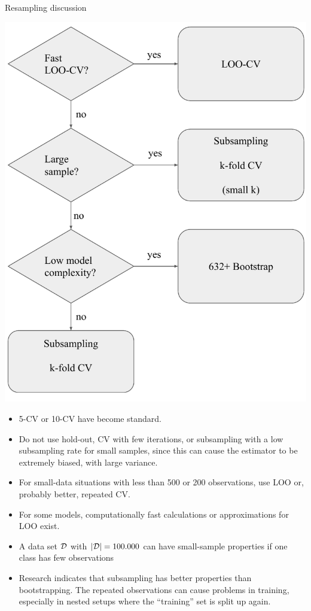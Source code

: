 \begin{vbframe}{Resampling discussion}
\fboxsep=0pt
\noindent%
\begin{minipage}[t]{0.42\linewidth}
\vspace{0pt}
\includegraphics{figure_man/resampling_dec_tree}
\end{minipage}%
\hfill%
%
\begin{minipage}[t]{0.58\linewidth}
\vspace{0pt}
\scriptsize
\begin{itemize}
  \item 5-CV or 10-CV have become standard.
  \item Do not use hold-out, CV with few iterations, or subsampling with a low 
  subsampling rate for small samples, since this can cause the estimator to be 
  extremely biased, with large variance.
  \item For small-data situations with less than 500 or 200 observations, use 
  LOO or, probably better, repeated CV.
  \item For some models, computationally fast calculations or approximations 
  for LOO exist.
  \item A data set $\mathcal{D}$ with $|\mathcal{D}| = 100.000$ can have small-sample properties 
  if one class has few observations 
  \item Research indicates that subsampling has better properties than
    bootstrapping. The repeated observations can cause problems in training,
    especially in nested setups where the \enquote{training} set is split up again.
\end{itemize}
\end{minipage}



\end{vbframe}

\endlecture


